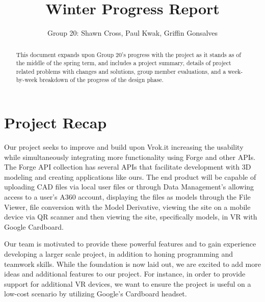 \documentclass[10pt,draftclsnofoot,onecolumn]{IEEEtran}
\begin{document}
\title{Winter Progress Report}
\author{Group 20: Shawn Cross, Paul Kwak, Griffin Gonsalves}
\maketitle
\hspace*{\fill}\hspace*{\fill}
\vspace{2cm}
\begin{abstract}
This document expands upon Group 20's progress with the project as it stands as of the middle of the spring term, and includes a project summary, details of project related problems with changes and solutions, group member evaluations, and a week-by-week breakdown of the progress of the design phase. 
\end{abstract}
\IEEEpeerreviewmaketitle

\newpage
{}

\section{Project Recap}
Our project seeks to improve and build upon Vrok.it increasing the usability while simultaneously integrating more functionality using Forge and other APIs. The Forge API collection has several APIs that facilitate development with 3D modeling and creating applications like ours. The end product will be capable of uploading CAD files via local user files or through Data Management’s allowing access to a user’s A360 account, displaying the files as models through the File Viewer, file conversion with the Model Derivative, viewing the site on a mobile device via QR scanner and then viewing the site, specifically models, in VR with Google Cardboard.

Our team is motivated to provide these powerful features and to gain experience developing a larger scale project, in addition to honing programming and teamwork skills. While the foundation is now laid out, we are excited to add more ideas and additional features to our project. For instance, in order to provide support for additional VR devices, we want to ensure the project is useful on a low-cost scenario by utilizing Google's Cardboard headset.
\end{document}
